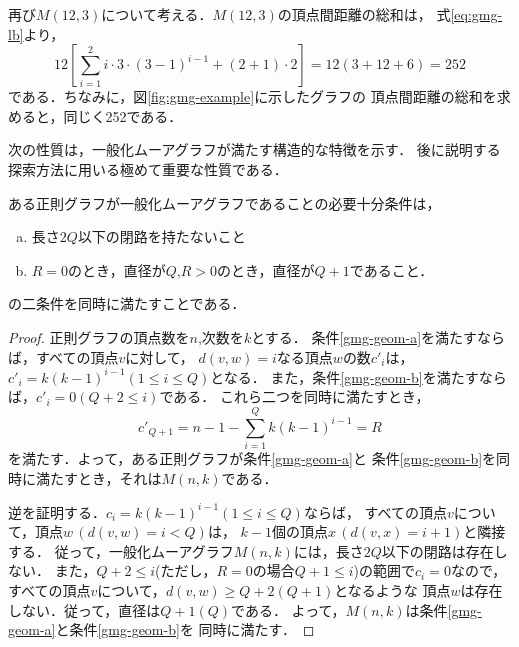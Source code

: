 \begin{example}
  再び$M(12,3)$について考える．$M(12,3)$の頂点間距離の総和は，
  式\ref{eq:gmg-lb}より，
  \[ 12\left[\sum_{i=1}^2i\cdot3\cdot(3-1)^{i-1}+(2+1)\cdot2\right]=
  12(3+12+6)=252\]
  である．ちなみに，図\ref{fig:gmg-example}に示したグラフの
  頂点間距離の総和を求めると，同じく252である．
\end{example}

次の性質は，一般化ムーアグラフが満たす構造的な特徴を示す．
後に説明する探索方法に用いる極めて重要な性質である．
\begin{theorem}
  \label{thm:gmg-geometric-property}
  ある正則グラフが一般化ムーアグラフであることの必要十分条件は，
  \begin{enumerate}[(a)]
  \item 長さ$2Q$以下の閉路を持たないこと
    \label{gmg-geom-a}
  \item $R=0$のとき，直径が$Q$,\hspace{2ex}$R>0$のとき，直径が$Q+1$であること．
    \label{gmg-geom-b}
  \end{enumerate}
  の二条件を同時に満たすことである．
\end{theorem}
\begin{proof}
  正則グラフの頂点数を$n$,次数を$k$とする．
  条件\ref{gmg-geom-a}を満たすならば，すべての頂点$v$に対して，
  $d(v,w)=i$なる頂点$w$の数$c'_i$は，$c'_i=k(k-1)^{i-1}(1\leq i\leq Q)$となる．
  また，条件\ref{gmg-geom-b}を満たすならば，$c'_i=0(Q+2\leq i)$である．
  これら二つを同時に満たすとき，
  \[ c'_{Q+1}=n-1-\sum_{i=1}^{Q}k(k-1)^{i-1}=R \]
  を満たす．よって，ある正則グラフが条件\ref{gmg-geom-a}と
  条件\ref{gmg-geom-b}を同時に満たすとき，それは$M(n,k)$である．

  逆を証明する．$c_i=k(k-1)^{i-1}(1\leq i\leq Q)$ならば，
  すべての頂点$v$について，頂点$w\,(d(v,w)=i<Q)$は，
  $k-1$個の頂点$x\,(d(v,x)=i+1)$と隣接する．
  従って，一般化ムーアグラフ$M(n,k)$には，長さ$2Q$以下の閉路は存在しない．
  また，$Q+2\leq i$(ただし，$R=0$の場合$Q+1\leq i$)の範囲で$c_i=0$なので，
  すべての頂点$v$について，$d(v,w)\geq Q+2$\hspace{.3ex}$(Q+1)$となるような
  頂点$w$は存在しない．従って，直径は$Q+1$\hspace{.3ex}$(Q)$である．
  よって，$M(n,k)$は条件\ref{gmg-geom-a}と条件\ref{gmg-geom-b}を
  同時に満たす．
\end{proof}
